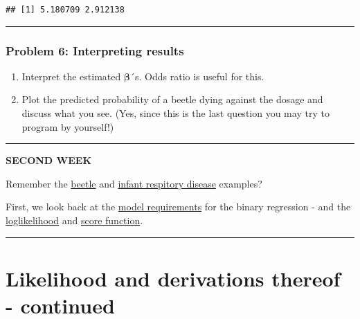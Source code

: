 \documentclass[
]{article}
\newenvironment{Shaded}{\begin{snugshade}}{\end{snugshade}}
\newcommand{\CommentTok}[1]{\textcolor[rgb]{0.56,0.35,0.01}{\textit{#1}}}
\newcommand{\FunctionTok}[1]{\textcolor[rgb]{0.13,0.29,0.53}{\textbf{#1}}}
\newcommand{\NormalTok}[1]{#1}
\newcommand{\SpecialCharTok}[1]{\textcolor[rgb]{0.81,0.36,0.00}{\textbf{#1}}}
\providecommand{\tightlist}{%
  \setlength{\itemsep}{0pt}\setlength{\parskip}{0pt}}
\begin{document}
\begin{Shaded}
\end{Shaded}

\begin{verbatim}
## [1] 5.180709 2.912138
\end{verbatim}

\begin{center}\rule{0.5\linewidth}{0.5pt}\end{center}

\hypertarget{problem-6-interpreting-results}{%
\subsubsection{Problem 6: Interpreting
results}\label{problem-6-interpreting-results}}

\begin{enumerate}
\def\labelenumi{\alph{enumi})}
\tightlist
\item
  Interpret the estimated \(\boldsymbol{\beta}\)´s. Odds ratio is useful
  for this.
\item
  Plot the predicted probability of a beetle dying against the dosage
  and discuss what you see. (Yes, since this is the last question you
  may try to program by yourself!)
\end{enumerate}

\begin{center}\rule{0.5\linewidth}{0.5pt}\end{center}

\textbf{SECOND WEEK}

Remember the \protect\hyperlink{beetle1}{beetle} and
\protect\hyperlink{infant1}{infant respitory disease} examples?

First, we look back at the \protect\hyperlink{binaryregassump}{model
requirements} for the binary regression - and the
\protect\hyperlink{loglik}{loglikelihood} and
\protect\hyperlink{score}{score function}.

\begin{center}\rule{0.5\linewidth}{0.5pt}\end{center}

\hypertarget{likelihood-and-derivations-thereof---continued}{%
\section{Likelihood and derivations thereof -
continued}\label{likelihood-and-derivations-thereof---continued}}
\end{document}
